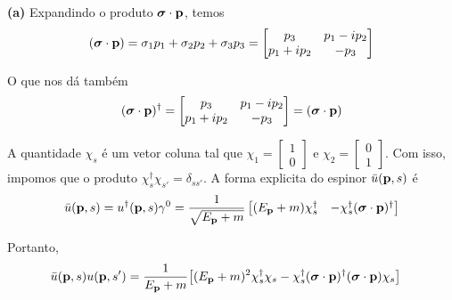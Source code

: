 

\noindent \textbf{(a)} Expandindo o produto $\boldsymbol{\sigma}\cdot\vb{p}$, temos
    \begin{equation*}
        (\boldsymbol{\sigma}\cdot\vb{p}) = \sigma_{1}p_{1} + \sigma_{2}p_{2} + \sigma_{3}p_{3} = 
        \begin{bmatrix}
            p_{3}           &   p_{1} - ip_{2} \\
            p_{1} + ip_{2}  &   -p_{3}
        \end{bmatrix}
    \end{equation*}

O que nos dá também
    \begin{equation*}
        (\boldsymbol{\sigma}\cdot\vb{p})^{\dagger} = 
        \begin{bmatrix}
            p_{3} & p_{1} - ip_{2} \\
            p_{1} + ip_{2} & -p_{3}
        \end{bmatrix} = (\boldsymbol{\sigma}\cdot\vb{p})
    \end{equation*}

A quantidade $\chi_{s}$ é um vetor coluna tal que $\chi_{1} = \begin{bmatrix} 1 \\ 0 \end{bmatrix}$ e $\chi_{2} = \begin{bmatrix} 0 \\ 1 \end{bmatrix}$. Com isso, impomos que o produto $\chi_{s}^{\dagger}\chi_{s'} = \delta_{ss'}$. A forma explicita do espinor $\Bar{u}(\vb{p},s)$ é
    \begin{equation*}
        \bar{u}(\vb{p},s) = u^{\dagger}(\vb{p},s) \gamma^{0} = \dfrac{1}{\sqrt{E_{\vb{p}} + m}}
        \begin{bmatrix}
            (E_{\vb{p}} + m) \chi^{\dagger}_{s} & -\chi^{\dagger}_{s}(\boldsymbol{\sigma}\cdot\vb{p})^{\dagger}
        \end{bmatrix}
    \end{equation*}

Portanto, 
    \begin{align*}
        \bar{u}(\vb{p},s)u(\vb{p},s') &= \dfrac{1}{E_{\vb{p}}+m} \qty[
            (E_{\vb{p}} + m)^2 \chi^{\dagger}_{s}\chi_{s} - \chi^{\dagger}_{s}(\boldsymbol{\sigma}\cdot\vb{p})^{\dagger}(\boldsymbol{\sigma}\cdot\vb{p})\chi_{s}
        ]
    \end{align*}

